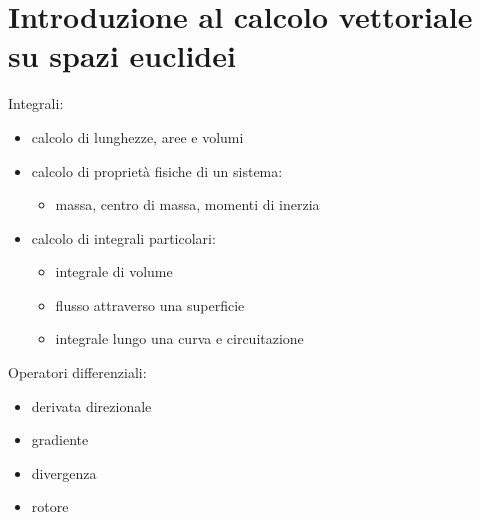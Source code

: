 \documentclass[letterpaper,10pt,italian]{jupyterBook}
\begin{document}
\chapter{Introduzione al calcolo vettoriale su spazi euclidei}
\label{\detokenize{ch/vector-calculus:introduzione-al-calcolo-vettoriale-su-spazi-euclidei}}\label{\detokenize{ch/vector-calculus:vector-calculus}}\label{\detokenize{ch/vector-calculus::doc}}
\sphinxAtStartPar
Integrali:
\begin{itemize}
\item {} 
\sphinxAtStartPar
calcolo di lunghezze, aree e volumi

\item {} 
\sphinxAtStartPar
calcolo di proprietà fisiche di un sistema:
\begin{itemize}
\item {} 
\sphinxAtStartPar
massa, centro di massa, momenti di inerzia

\end{itemize}

\item {} 
\sphinxAtStartPar
calcolo di integrali particolari:
\begin{itemize}
\item {} 
\sphinxAtStartPar
integrale di volume

\item {} 
\sphinxAtStartPar
flusso attraverso una superficie

\item {} 
\sphinxAtStartPar
integrale lungo una curva e circuitazione

\end{itemize}

\end{itemize}

\sphinxAtStartPar
Operatori differenziali:
\begin{itemize}
\item {} 
\sphinxAtStartPar
derivata direzionale

\item {} 
\sphinxAtStartPar
gradiente

\item {} 
\sphinxAtStartPar
divergenza

\item {} 
\sphinxAtStartPar
rotore

\end{itemize}

\sphinxstepscope
\end{document}
